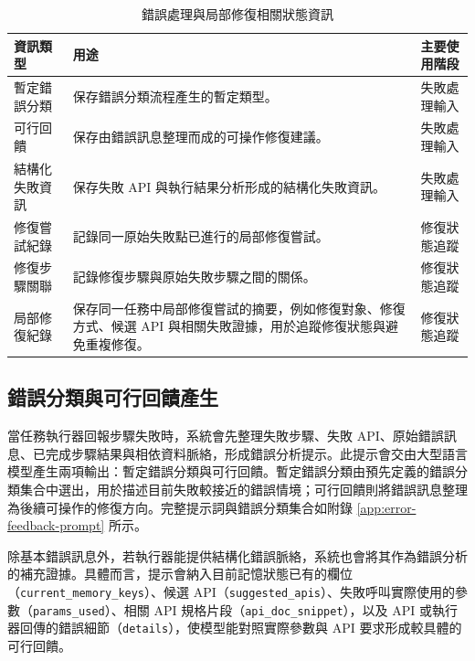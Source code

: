 \begin{ZhChapter}
\begin{table}[htbp]
    \centering
    \caption{錯誤處理與局部修復相關狀態資訊}
    \label{tab:chapter4_state_fields}
    \footnotesize
    \renewcommand{\arraystretch}{1.2}
    \begin{tabularx}{0.95\textwidth}{
        >{\raggedright\arraybackslash}p{}
        >{\raggedright\arraybackslash}X
        >{\raggedright\arraybackslash}p{}
    }
        \hline
        \textbf{資訊類型} & \textbf{用途} & \textbf{主要使用階段} \\
        \hline
        暫定錯誤分類 &
        保存錯誤分類流程產生的暫定類型。 &
        失敗處理輸入 \\[0.35em]
        可行回饋 &
        保存由錯誤訊息整理而成的可操作修復建議。 &
        失敗處理輸入 \\[0.35em]
        結構化失敗資訊 &
        保存失敗 API 與執行結果分析形成的結構化失敗資訊。 &
        失敗處理輸入 \\[0.35em]
        修復嘗試紀錄 &
        記錄同一原始失敗點已進行的局部修復嘗試。 &
        修復狀態追蹤 \\[0.35em]
        修復步驟關聯 &
        記錄修復步驟與原始失敗步驟之間的關係。 &
        修復狀態追蹤 \\[0.35em]
        局部修復紀錄 &
        保存同一任務中局部修復嘗試的摘要，例如修復對象、修復方式、候選 API 與相關失敗證據，用於追蹤修復狀態與避免重複修復。 &
        修復狀態追蹤 \\
        \hline
    \end{tabularx}
\end{table}


\subsection{錯誤分類與可行回饋產生}

當任務執行器回報步驟失敗時，系統會先整理失敗步驟、失敗 API、原始錯誤訊息、已完成步驟結果與相依資料脈絡，形成錯誤分析提示。此提示會交由大型語言模型產生兩項輸出：暫定錯誤分類與可行回饋。暫定錯誤分類由預先定義的錯誤分類集合中選出，用於描述目前失敗較接近的錯誤情境；可行回饋則將錯誤訊息整理為後續可操作的修復方向。完整提示詞與錯誤分類集合如附錄 \ref{app:error-feedback-prompt} 所示。

除基本錯誤訊息外，若執行器能提供結構化錯誤脈絡，系統也會將其作為錯誤分析的補充證據。具體而言，提示會納入目前記憶狀態已有的欄位（\texttt{current\_memory\_keys}）、候選 API（\texttt{suggested\_apis}）、失敗呼叫實際使用的參數（\texttt{params\_used}）、相關 API 規格片段（\texttt{api\_doc\_snippet}），以及 API 或執行器回傳的錯誤細節（\texttt{details}），使模型能對照實際參數與 API 要求形成較具體的可行回饋。


\end{ZhChapter}
